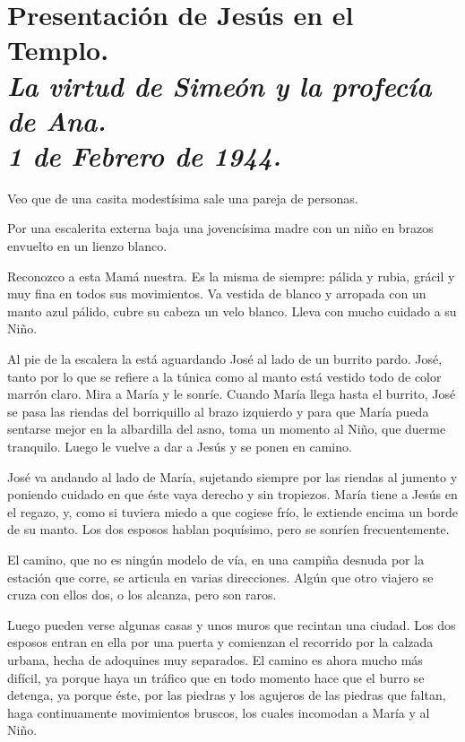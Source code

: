 \documentclass[12pt, twoside, openright]{book} %
\begin{document}
\chapter*{Presentación de Jesús en el Templo. \\ \normalfont\normalsize\textit{La virtud de Simeón y la profecía de Ana. \\ 1 de Febrero de 1944.}}

Veo que de una casita modestísima sale una pareja de personas. 

Por una escalerita externa baja una jovencísima madre con un niño en brazos envuelto en un lienzo blanco. 

Reconozco a esta Mamá nuestra. Es la misma de siempre: pálida y rubia, grácil y muy fina en todos sus movimientos. Va vestida de blanco y arropada con un manto azul pálido, cubre su cabeza un velo blanco. Lleva con mucho cuidado a su Niño. 

Al pie de la escalera la está aguardando José al lado de un burrito pardo. José, tanto por lo que se refiere a la túnica como al manto está vestido todo de color marrón claro. Mira a María y le sonríe. Cuando María llega hasta el burrito, José se pasa las riendas del borriquillo al brazo izquierdo y para que María pueda sentarse mejor en la albardilla del asno, toma un momento al Niño, que duerme tranquilo. Luego le vuelve a dar a Jesús y se ponen en camino. 

José va andando al lado de María, sujetando siempre por las riendas al jumento y poniendo cuidado en que éste vaya derecho y sin tropiezos. María tiene a Jesús en el regazo, y, como si tuviera miedo a que cogiese frío, le extiende encima un borde de su manto. Los dos esposos hablan poquísimo, pero se sonríen frecuentemente. 

El camino, que no es ningún modelo de vía, en una campiña desnuda por la estación que corre, se articula en varias direcciones. Algún que otro viajero se cruza con ellos dos, o los alcanza, pero son raros. 

Luego pueden verse algunas casas y unos muros que recintan una ciudad. Los dos esposos entran en ella por una puerta y comienzan el recorrido por la calzada urbana, hecha de adoquines muy separados. El camino es ahora mucho más difícil, ya porque haya un tráfico que en todo momento hace que el burro se detenga, ya porque éste, por las piedras y los agujeros de las piedras que faltan, haga continuamente movimientos bruscos, los cuales incomodan a María y al Niño. 
\end{document}
